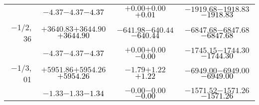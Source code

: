 \documentclass[compress]{beamer}
\begin{document}
\begin{frame}
{\begin{tabular}{r | c | c | c}
           & $-4.37$\hspace{0.1 cm}$-4.37$\hspace{0.1 cm}\textcolor{black}{$-4.37$} & $+0.00$\hspace{0.1 cm}$+0.00$\hspace{0.1 cm}\textcolor{black}{$+0.01$} & $-1919.68$\hspace{0.1 cm}$-1918.83$\hspace{0.1 cm}\textcolor{black}{$-1918.83$} \\
$-$1/2, 36 & $+3640.83$\hspace{0.1 cm}$+3644.90$\hspace{0.1 cm}\textcolor{black}{$+3644.90$} & $-641.98$\hspace{0.1 cm}$-640.44$\hspace{0.1 cm}\textcolor{black}{$-640.44$} & $-6847.68$\hspace{0.1 cm}$-6847.68$\hspace{0.1 cm}\textcolor{black}{$-6847.68$} \\
           & $-4.37$\hspace{0.1 cm}$-4.37$\hspace{0.1 cm}\textcolor{black}{$-4.37$} & $+0.00$\hspace{0.1 cm}$+0.00$\hspace{0.1 cm}\textcolor{black}{$-0.00$} & $-1745.15$\hspace{0.1 cm}$-1744.30$\hspace{0.1 cm}\textcolor{black}{$-1744.30$} \\
$-$1/3, 01 & $+5951.86$\hspace{0.1 cm}$+5954.26$\hspace{0.1 cm}\textcolor{black}{$+5954.26$} & $-1.79$\hspace{0.1 cm}$+1.22$\hspace{0.1 cm}\textcolor{black}{$+1.22$} & $-6949.00$\hspace{0.1 cm}$-6949.00$\hspace{0.1 cm}\textcolor{black}{$-6949.00$} \\
           & $-1.33$\hspace{0.1 cm}$-1.33$\hspace{0.1 cm}\textcolor{black}{$-1.34$} & $-0.00$\hspace{0.1 cm}$-0.00$\hspace{0.1 cm}\textcolor{black}{$-0.00$} & $-1571.52$\hspace{0.1 cm}$-1571.26$\hspace{0.1 cm}\textcolor{black}{$-1571.26$} \\

\end{tabular}}
\end{frame}
\end{document}
